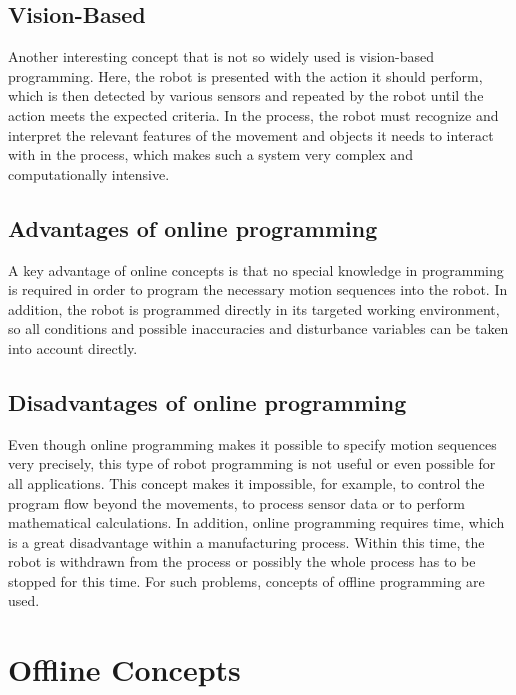 \documentclass[conference]{IEEEtran}
\begin{document}
    \subsection{Vision-Based}
        Another interesting concept that is not so widely used is vision-based programming. Here, the robot is presented with the action it should perform, which is then detected by various sensors and repeated by the robot until the action meets the expected criteria. \cite[p. 178]{b5} %
        In the process, the robot must recognize and interpret the relevant features of the movement and objects it needs to interact with in the process, \cite[p. 7]{p4} %
        which makes such a system very complex and computationally intensive. \cite[p. 300]{p5} %

    \subsection{Advantages of online programming}
        A key advantage of online concepts is that no special knowledge in programming is required in order to program the necessary motion sequences into the robot. In addition, the robot is programmed directly in its targeted working environment, so all conditions and possible inaccuracies and disturbance variables can be taken into account directly. \cite[p. 92]{b6} %

    \subsection{Disadvantages of online programming}
        Even though online programming makes it possible to specify motion sequences very precisely, this type of robot programming is not useful or even possible for all applications. This concept makes it impossible, for example, to control the program flow beyond the movements, to process sensor data or to perform mathematical calculations. In addition, online programming requires time, which is a great disadvantage within a manufacturing process. Within this time, the robot is withdrawn from the process or possibly the whole process has to be stopped for this time. For such problems, concepts of offline programming are used. \cite[pp. 190 - 191]{b4}%

\section{Offline Concepts}
\end{document}
